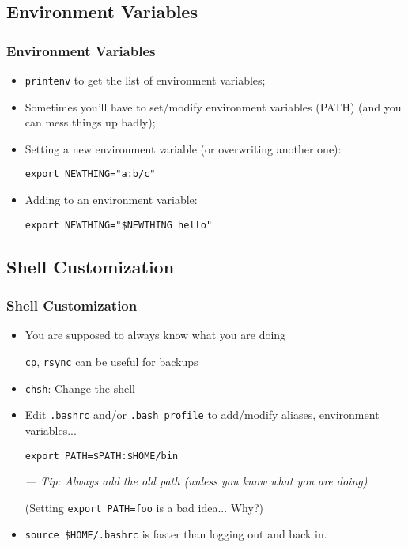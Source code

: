 \documentclass[utf8x,10pt]{beamer}
\begin{document}
\subsection{Environment Variables}
\begin{frame}
  \frametitle{Environment Variables}

  \begin{itemize}
  \item \texttt{printenv} to get the list of environment variables;
  \item Sometimes you’ll have to set/modify environment variables
    (PATH) (and you can mess things up badly);
  \item Setting a new environment variable (or overwriting another
    one):

    \texttt{export NEWTHING="a:b/c"}
  \item Adding to an environment variable:

    \texttt{export NEWTHING="\$NEWTHING hello"}
  \end{itemize}
\end{frame}

\subsection{Shell Customization}
\begin{frame}
  \frametitle{Shell Customization}

  \begin{itemize}
  \item You are supposed to always know what you are doing

    \texttt{cp}, \texttt{rsync} can be useful for backups

  \item \texttt{chsh}: Change the shell
  \item Edit \texttt{.bashrc} and/or \texttt{.bash\_profile} to
    add/modify aliases, environment variables...

    \texttt{export PATH=\$PATH:\$HOME/bin}

    \hfill \emph{--- Tip: Always add the old path (unless you know what you are doing)}

    (Setting \texttt{export PATH=foo} is a bad idea... Why?)
  \item \texttt{source \$HOME/.bashrc} is faster than logging out and
    back in.
  \end{itemize}
\end{frame}
\end{document}
